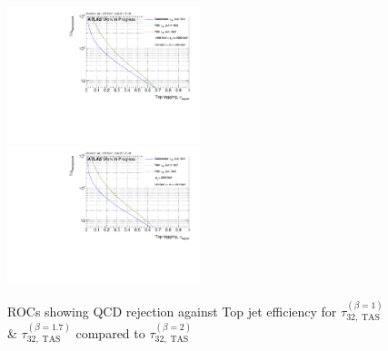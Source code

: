 \begin{figure}[H]
\bigskip
\includegraphics[width=0.5\textwidth]{sascha_input/Appendix/Top_best/ROC_ALL_h_recoJet_nSub32_2_bin5.pdf} \hspace{1mm}
\includegraphics[width=0.5\textwidth]{sascha_input/Appendix/Top_best/ROC_ALL_h_recoJet_nSub32_2_bin6.pdf}
\caption{\footnotesize{ROCs showing QCD rejection against Top jet efficiency for $\tau_{32,\;\text{TAS}}^{(\beta=1)}$ \& $\tau_{32,\;\text{TAS}}^{(\beta=1.7)}$ compared to $\tau_{32,\;\text{TAS}}^{(\beta=2)}$}}
\end{figure}\label{fig:ROC_best_top}



